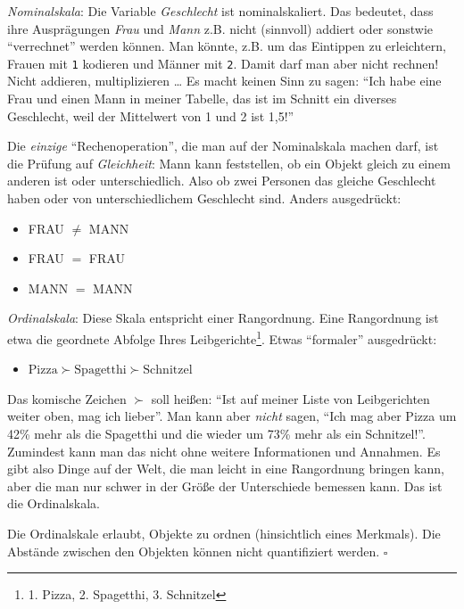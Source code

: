 \documentclass[
  a4paper,
  DIV=11]{scrreprt}
\providecommand{\tightlist}{%
  \setlength{\itemsep}{0pt}\setlength{\parskip}{0pt}}\usepackage{longtable,booktabs,array}
\theoremstyle{definition}
\theoremstyle{definition}
\theoremstyle{definition}
\theoremstyle{remark}
\begin{document}
\emph{Nominalskala}: Die Variable \emph{Geschlecht} ist nominalskaliert.
Das bedeutet, dass ihre Ausprägungen \emph{Frau} und \emph{Mann} z.B.
nicht (sinnvoll) addiert oder sonstwie ``verrechnet'' werden können. Man
könnte, z.B. um das Eintippen zu erleichtern, Frauen mit \texttt{1}
kodieren und Männer mit \texttt{2}. Damit darf man aber nicht rechnen!
Nicht addieren, multiplizieren \ldots{} Es macht keinen Sinn zu sagen:
``Ich habe eine Frau und einen Mann in meiner Tabelle, das ist im
Schnitt ein diverses Geschlecht, weil der Mittelwert von 1 und 2 ist
1,5!''

Die \emph{einzige} ``Rechenoperation'', die man auf der Nominalskala
machen darf, ist die Prüfung auf \emph{Gleichheit}: Mann kann
feststellen, ob ein Objekt gleich zu einem anderen ist oder
unterschiedlich. Also ob zwei Personen das gleiche Geschlecht haben oder
von unterschiedlichem Geschlecht sind. Anders ausgedrückt:

\begin{itemize}
\tightlist
\item
  FRAU \(\ne\) MANN
\item
  FRAU \(=\) FRAU
\item
  MANN \(=\) MANN
\end{itemize}

\emph{Ordinalskala}: Diese Skala entspricht einer Rangordnung. Eine
Rangordnung ist etwa die geordnete Abfolge Ihres
Leibgerichte\footnote{1. Pizza, 2. Spagetthi, 3. Schnitzel}. Etwas
``formaler'' ausgedrückt:

\begin{itemize}
\tightlist
\item
  \(\text{Pizza} \succ \text{Spagetthi} \succ \text{Schnitzel}\)
\end{itemize}

Das komische Zeichen \(\succ\) soll heißen: ``Ist auf meiner Liste von
Leibgerichten weiter oben, mag ich lieber''. Man kann aber \emph{nicht}
sagen, ``Ich mag aber Pizza um 42\% mehr als die Spagetthi und die
wieder um 73\% mehr als ein Schnitzel!''. Zumindest kann man das nicht
ohne weitere Informationen und Annahmen. Es gibt also Dinge auf der
Welt, die man leicht in eine Rangordnung bringen kann, aber die man nur
schwer in der Größe der Unterschiede bemessen kann. Das ist die
Ordinalskala.

\begin{tcolorbox}[enhanced jigsaw, toptitle=1mm, rightrule=.15mm, colbacktitle=quarto-callout-important-color!10!white, breakable, title=\textcolor{quarto-callout-important-color}{\faExclamation}\hspace{0.5em}{Wichtig}, bottomrule=.15mm, colback=white, opacitybacktitle=0.6, left=2mm, titlerule=0mm, toprule=.15mm, coltitle=black, opacityback=0, bottomtitle=1mm, arc=.35mm, leftrule=.75mm, colframe=quarto-callout-important-color-frame]

Die Ordinalskale erlaubt, Objekte zu ordnen (hinsichtlich eines
Merkmals). Die Abstände zwischen den Objekten können nicht quantifiziert
werden. \(\square\)

\end{tcolorbox}
\end{document}
